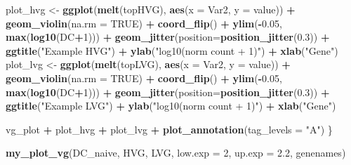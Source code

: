 \documentclass[9pt,a4paper,]{extarticle}
\newenvironment{Shaded}{\begin{snugshade}}{\end{snugshade}}
\newcommand{\DataTypeTok}[1]{\textcolor[rgb]{0.13,0.29,0.53}{#1}}
\newcommand{\DecValTok}[1]{\textcolor[rgb]{0.00,0.00,0.81}{#1}}
\newcommand{\FloatTok}[1]{\textcolor[rgb]{0.00,0.00,0.81}{#1}}
\newcommand{\KeywordTok}[1]{\textcolor[rgb]{0.13,0.29,0.53}{\textbf{#1}}}
\newcommand{\NormalTok}[1]{#1}
\newcommand{\OperatorTok}[1]{\textcolor[rgb]{0.81,0.36,0.00}{\textbf{#1}}}
\newcommand{\OtherTok}[1]{\textcolor[rgb]{0.56,0.35,0.01}{#1}}
\newcommand{\StringTok}[1]{\textcolor[rgb]{0.31,0.60,0.02}{#1}}
\begin{document}
\begin{Shaded}
\begin{Highlighting}[]
\NormalTok{  plot_hvg <-}\StringTok{ }\KeywordTok{ggplot}\NormalTok{(}\KeywordTok{melt}\NormalTok{(topHVG), }\KeywordTok{aes}\NormalTok{(}\DataTypeTok{x =}\NormalTok{ Var2, }\DataTypeTok{y =}\NormalTok{ value)) }\OperatorTok{+}\StringTok{ }
\StringTok{    }\KeywordTok{geom_violin}\NormalTok{(}\DataTypeTok{na.rm =} \OtherTok{TRUE}\NormalTok{) }\OperatorTok{+}\StringTok{ }\KeywordTok{coord_flip}\NormalTok{() }\OperatorTok{+}\StringTok{ }\KeywordTok{ylim}\NormalTok{(}\OperatorTok{-}\FloatTok{0.05}\NormalTok{, }\KeywordTok{max}\NormalTok{(}\KeywordTok{log10}\NormalTok{(DC}\OperatorTok{+}\DecValTok{1}\NormalTok{))) }\OperatorTok{+}
\StringTok{    }\KeywordTok{geom_jitter}\NormalTok{(}\DataTypeTok{position=}\KeywordTok{position_jitter}\NormalTok{(}\FloatTok{0.3}\NormalTok{)) }\OperatorTok{+}
\StringTok{    }\KeywordTok{ggtitle}\NormalTok{(}\StringTok{"Example HVG"}\NormalTok{) }\OperatorTok{+}
\StringTok{    }\KeywordTok{ylab}\NormalTok{(}\StringTok{"log10(norm count + 1)"}\NormalTok{) }\OperatorTok{+}\StringTok{ }\KeywordTok{xlab}\NormalTok{(}\StringTok{"Gene"}\NormalTok{)}
\NormalTok{  plot_lvg <-}\StringTok{ }\KeywordTok{ggplot}\NormalTok{(}\KeywordTok{melt}\NormalTok{(topLVG), }\KeywordTok{aes}\NormalTok{(}\DataTypeTok{x =}\NormalTok{ Var2, }\DataTypeTok{y =}\NormalTok{ value)) }\OperatorTok{+}\StringTok{ }
\StringTok{    }\KeywordTok{geom_violin}\NormalTok{(}\DataTypeTok{na.rm =} \OtherTok{TRUE}\NormalTok{) }\OperatorTok{+}\StringTok{ }\KeywordTok{coord_flip}\NormalTok{() }\OperatorTok{+}\StringTok{ }\KeywordTok{ylim}\NormalTok{(}\OperatorTok{-}\FloatTok{0.05}\NormalTok{, }\KeywordTok{max}\NormalTok{(}\KeywordTok{log10}\NormalTok{(DC}\OperatorTok{+}\DecValTok{1}\NormalTok{))) }\OperatorTok{+}
\StringTok{    }\KeywordTok{geom_jitter}\NormalTok{(}\DataTypeTok{position=}\KeywordTok{position_jitter}\NormalTok{(}\FloatTok{0.3}\NormalTok{)) }\OperatorTok{+}
\StringTok{    }\KeywordTok{ggtitle}\NormalTok{(}\StringTok{"Example LVG"}\NormalTok{) }\OperatorTok{+}
\StringTok{    }\KeywordTok{ylab}\NormalTok{(}\StringTok{"log10(norm count + 1)"}\NormalTok{) }\OperatorTok{+}\StringTok{ }\KeywordTok{xlab}\NormalTok{(}\StringTok{"Gene"}\NormalTok{)}
  
\NormalTok{  vg_plot }\OperatorTok{+}\StringTok{ }\NormalTok{plot_hvg }\OperatorTok{+}\StringTok{ }\NormalTok{plot_lvg }\OperatorTok{+}\StringTok{ }\KeywordTok{plot_annotation}\NormalTok{(}\DataTypeTok{tag_levels =} \StringTok{"A"}\NormalTok{)}
\NormalTok{\}}

\KeywordTok{my_plot_vg}\NormalTok{(DC_naive, HVG, LVG, }\DataTypeTok{low.exp =} \DecValTok{2}\NormalTok{, }\DataTypeTok{up.exp =} \FloatTok{2.2}\NormalTok{, genenames)}
\end{Highlighting}
\end{Shaded}
\end{document}
